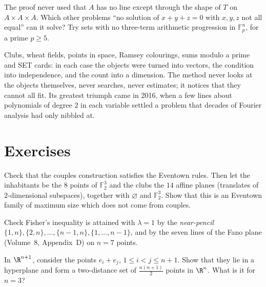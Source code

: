 \begin{think}
The proof never used that $A$ has no line except through the shape of $T$ on $A\times A\times A$. Which other problems ``no solution of $x+y+z=0$ with $x,y,z$ not all equal'' can it solve? Try sets with no
three-term arithmetic progression in $\mathbb F_p^n$, for a prime $p\ge5$.
\end{think}

\begin{beauty}
Clubs, wheat fields, points in space, Ramsey colourings, sums modulo a prime and SET cards: in each case the objects were turned into vectors, the condition into independence, and the count into a dimension.
The method never looks at the objects themselves, never searches, never estimates; it notices that they cannot all fit. Its greatest triumph came in 2016, when a few lines about polynomials of
degree $2$ in each variable settled a problem that decades of Fourier analysis had only nibbled at.
\end{beauty}

\section{Exercises}

\begin{exercise}[$\star$]\label{combinatorial:ex:eventown}
Check that the couples construction satisfies the Eventown rules. Then let the inhabitants be the $8$ points of $\mathbb F_2^3$ and the clubs the $14$ affine planes (translates of $2$-dimensional subspaces),
together with $\varnothing$ and $\mathbb F_2^3$. Show that this is an Eventown family of maximum size which does not come from couples.
\end{exercise}

\begin{exercise}[$\star$]\label{combinatorial:ex:nearpencil}
Check Fisher's inequality is attained with $\lambda=1$ by the \emph{near-pencil} $\{1,n\},\{2,n\},\dots,\{n-1,n\},\{1,\dots,n-1\}$, and by the seven lines of the Fano plane (Volume~8, Appendix~D) on $n=7$ points.
\end{exercise}

\begin{exercise}[$\star$]\label{combinatorial:ex:simplexdist}
In $\R^{n+1}$, consider the points $e_i+e_j$, $1\le i<j\le n+1$. Show that they lie in a hyperplane and form a two-distance set of $\frac{n(n+1)}2$ points in $\R^n$. What is it for $n=3$?
\end{exercise}

